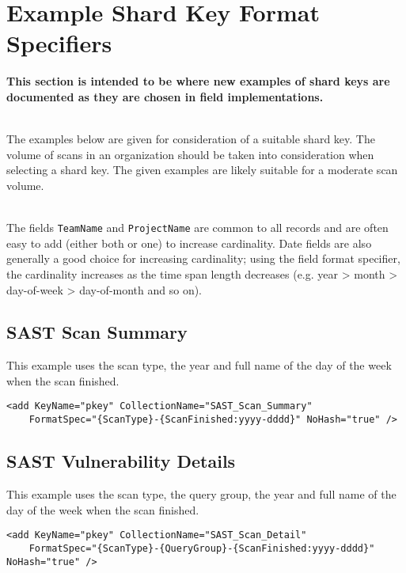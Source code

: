 \section{Example Shard Key Format Specifiers}

\textbf{This section is intended to be where new examples of shard keys are documented as they are chosen in field implementations.}

\noindent\\The examples below are given for consideration of a suitable shard key.  The volume of scans in an organization should be taken into
consideration when selecting a shard key.  The given examples are likely suitable for a moderate scan volume.

\noindent\\The fields \texttt{TeamName} and \texttt{ProjectName} are common to all records and are often easy to add (either both or one)
to increase cardinality.  Date fields are also generally a good choice for increasing cardinality; using the field format specifier, the cardinality increases as the
time span length decreases (e.g. year > month > day-of-week > day-of-month and so on).


\subsection{SAST Scan Summary}

This example uses the scan type, the year and full name of the day of the week when the scan finished.

\begin{lstlisting}
<add KeyName="pkey" CollectionName="SAST_Scan_Summary"
    FormatSpec="{ScanType}-{ScanFinished:yyyy-dddd}" NoHash="true" />
\end{lstlisting}

\subsection{SAST Vulnerability Details}

This example uses the scan type, the query group, the year and full name of the day of the week when the scan finished.

\begin{lstlisting}
<add KeyName="pkey" CollectionName="SAST_Scan_Detail"
    FormatSpec="{ScanType}-{QueryGroup}-{ScanFinished:yyyy-dddd}" NoHash="true" />
\end{lstlisting}





